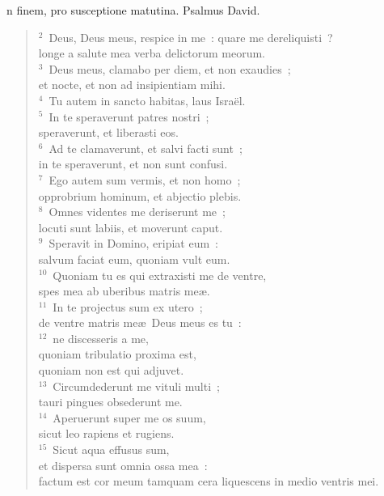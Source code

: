 \bchapter
{}n finem, pro susceptione matutina. Psalmus David.
\begin{flushleft}\begin{verse}\vspace{6pt}${}^{2}$~Deus, Deus meus, respice in me~: quare me dereliquisti~?\\ longe a salute mea verba delictorum meorum.\\
${}^{3}$~Deus meus, clamabo per diem, et non exaudies~;\\ et nocte, et non ad insipientiam mihi.\\
${}^{4}$~Tu autem in sancto habitas, laus Isra\"el.\\
${}^{5}$~In te speraverunt patres nostri~;\\ speraverunt, et liberasti eos.\\
${}^{6}$~Ad te clamaverunt, et salvi facti sunt~;\\ in te speraverunt, et non sunt confusi.\\
${}^{7}$~Ego autem sum vermis, et non homo~;\\ opprobrium hominum, et abjectio plebis.\\
${}^{8}$~Omnes videntes me deriserunt me~;\\ locuti sunt labiis, et moverunt caput.\\
${}^{9}$~Speravit in Domino, eripiat eum~:\\ salvum faciat eum, quoniam vult eum.\\
${}^{10}$~Quoniam tu es qui extraxisti me de ventre,\\ spes mea ab uberibus matris me\ae .\\
${}^{11}$~In te projectus sum ex utero~;\\ de ventre matris me\ae\ Deus meus es tu~:\\
${}^{12}$~ne discesseris a me,\\ quoniam tribulatio proxima est,\\ quoniam non est qui adjuvet.\\
${}^{13}$~Circumdederunt me vituli multi~;\\ tauri pingues obsederunt me.\\
${}^{14}$~Aperuerunt super me os suum,\\ sicut leo rapiens et rugiens.\\
${}^{15}$~Sicut aqua effusus sum,\\ et dispersa sunt omnia ossa mea~:\\ factum est cor meum tamquam cera liquescens in medio ventris mei.\\

\end{verse}
\end{flushleft}
